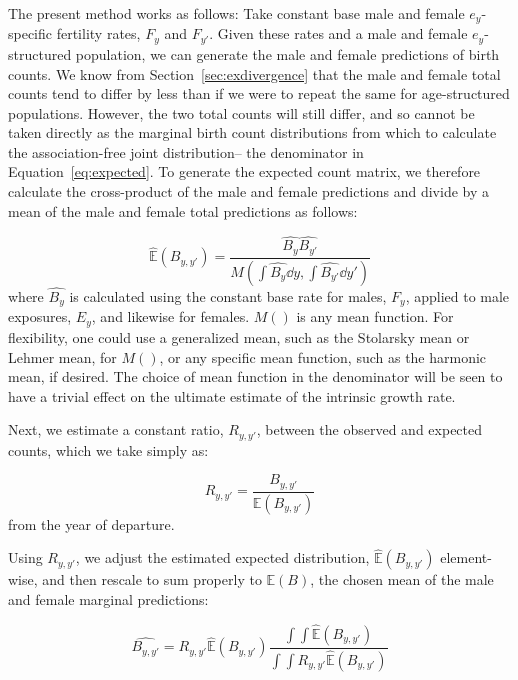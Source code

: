 
The present method works as follows: Take constant base male and female
$e_y$-specific fertility rates, $F_y$ and $F_{y'}$. Given these rates and a male
and female $e_y$-structured population, we can generate the male and female predictions of
birth counts. We know from Section~\ref{sec:exdivergence} that the male and
female total counts tend to differ by less than if we were to repeat the
same for age-structured populations. However, the two total counts will still
differ, and so cannot be taken directly as the marginal birth count distributions from
which to calculate the association-free joint distribution-- the denominator
in Equation~\eqref{eq:expected}. To generate the expected count matrix, we
therefore calculate the cross-product of the male and female predictions and
divide by a mean of the male and female total predictions as follows:

\begin{equation}
\label{eq:meanexp}
\widehat{\mathbb{E}}(B_{y,y'}) = \frac{\widehat{B_y} \widehat{B_{y'}}}{M(\int
\widehat{B_y} \dd y, \int \widehat{B_{y'}} \dd y')}
\end{equation}
where $\widehat{B_y}$ is calculated using the constant base rate for males,
$F_y$, applied to male exposures, $E_y$, and likewise for females. $M()$ is any
mean function. For flexibility, one could use a generalized mean, such as the
Stolarsky mean or Lehmer mean, for $M()$, or any specific mean function, such as
the harmonic mean, if desired. The choice of mean function in the denominator
will be seen to have a trivial effect on the ultimate estimate of the
intrinsic growth rate.

Next, we estimate a constant ratio, $R_{y,y'}$, between the
observed and expected counts, which we take simply as:

\begin{equation}
\label{eq:getR}
R_{y,y'} = \frac{B_{y,y'}}{\mathbb{E}(B_{y,y'})}
\end{equation}
from the year of departure.

Using $R_{y,y'}$, we adjust the estimated expected distribution,
$\widehat{\mathbb{E}}(B_{y,y'})$ element-wise, and then rescale to sum properly
to $\mathbb{E}(B)$, the chosen mean of the male and female marginal
predictions:

\begin{equation}
\label{eq:ratioadj}
\widehat{B_{y,y'}} = R_{y,y'}\widehat{\mathbb{E}}(B_{y,y'})\frac{\int \int
\widehat{\mathbb{E}}(B_{y,y'})}{\int \int
R_{y,y'}\widehat{\mathbb{E}}(B_{y,y'})}
\end{equation}

